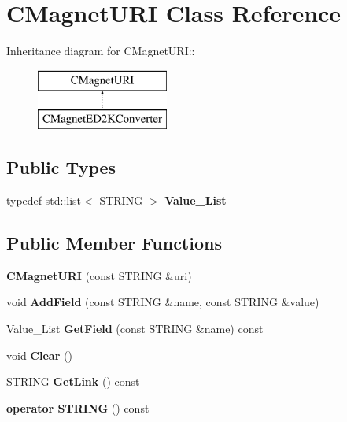 \section{CMagnetURI Class Reference}
\label{classCMagnetURI}
Inheritance diagram for CMagnetURI::\begin{figure}[H]
\begin{center}
\leavevmode
\includegraphics[height=2cm]{classCMagnetURI}
\end{center}
\end{figure}
\subsection*{Public Types}
\begin{DoxyCompactItemize}
\item 
typedef std::list$<$ STRING $>$ {\bfseries Value\_\-List}\label{classCMagnetURI_a44817a344b662b9ee5d260adba2702f3}

\end{DoxyCompactItemize}
\subsection*{Public Member Functions}
\begin{DoxyCompactItemize}
\item 
{\bfseries CMagnetURI} (const STRING \&uri)\label{classCMagnetURI_a3281593abbb2e526c0ca799ab57f2a18}

\item 
void {\bfseries AddField} (const STRING \&name, const STRING \&value)\label{classCMagnetURI_afb34ebe9af74f010fd09cfd467bcc732}

\item 
Value\_\-List {\bfseries GetField} (const STRING \&name) const \label{classCMagnetURI_aa1b2c415ed5f6d19826198ef1ba11bac}

\item 
void {\bfseries Clear} ()\label{classCMagnetURI_a7773180d183fabd42d3fe75bad48c167}

\item 
STRING {\bfseries GetLink} () const \label{classCMagnetURI_a41f432fd695125ac0f8e1bc47d9aec8a}

\item 
{\bfseries operator STRING} () const \label{classCMagnetURI_a4035bb7681644d610a4339a29bee66c6}

\end{DoxyCompactItemize}
